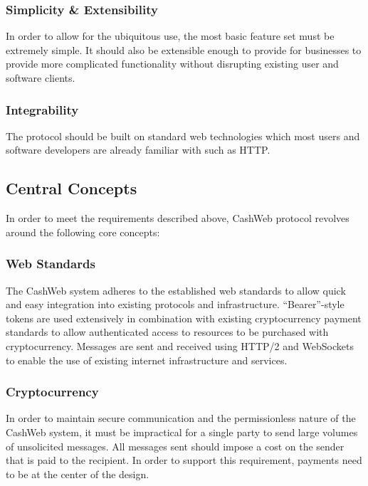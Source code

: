 \documentclass{article}
\begin{document}
\subsubsection{Simplicity \& Extensibility}

In order to allow for the ubiquitous use, the most basic feature set must be extremely simple. It should also be extensible enough to provide for businesses to provide more complicated functionality without disrupting existing user and software clients.

\subsubsection{Integrability}

The protocol should be built on standard web technologies which most users and software developers are already familiar with such as HTTP.

\subsection{Central Concepts} %

In order to meet the requirements described above, CashWeb protocol revolves around the following core concepts:

\subsubsection{Web Standards}

The CashWeb system adheres to the established web standards to allow quick and easy integration into existing protocols and infrastructure. ``Bearer''-style tokens are used extensively in combination with existing cryptocurrency payment standards to allow authenticated access to resources to be purchased with cryptocurrency. Messages are sent and received using HTTP/2\cite{rfc7540} and WebSockets\cite{rfc6455} to enable the use of existing internet infrastructure and services.

\subsubsection{Cryptocurrency}

In order to maintain secure communication and the permissionless nature of the CashWeb system, it must be impractical for a single party to send large volumes of unsolicited messages. All messages sent should impose a cost on the sender that is paid to the recipient. In order to support this requirement, payments need to be at the center of the design.
\end{document}
